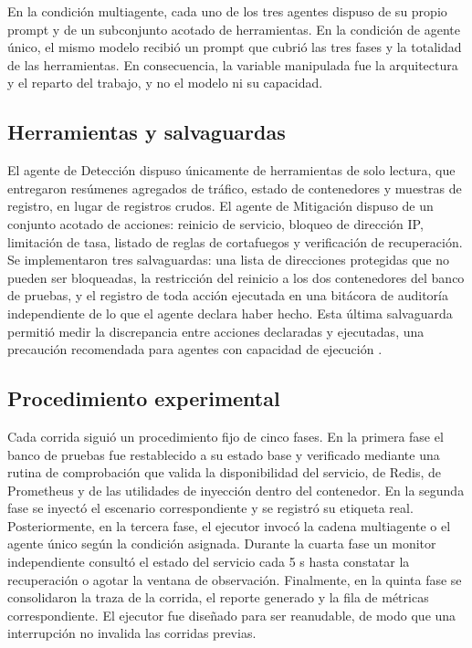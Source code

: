 \documentclass[conference]{IEEEtran}
\begin{document}
En la condición multiagente, cada uno de los tres agentes dispuso de su propio prompt
y de un subconjunto acotado de herramientas. En la condición de agente único, el mismo
modelo recibió un prompt que cubrió las tres fases y la totalidad de las herramientas.
En consecuencia, la variable manipulada fue la arquitectura y el reparto del trabajo,
y no el modelo ni su capacidad.

\subsection{Herramientas y salvaguardas}
El agente de Detección dispuso únicamente de herramientas de solo lectura, que
entregaron resúmenes agregados de tráfico, estado de contenedores y muestras de
registro, en lugar de registros crudos. El agente de Mitigación dispuso de un
conjunto acotado de acciones: reinicio de servicio, bloqueo de dirección IP,
limitación de tasa, listado de reglas de cortafuegos y verificación de recuperación.
Se implementaron tres salvaguardas: una lista de direcciones protegidas que no
pueden ser bloqueadas, la restricción del reinicio a los dos contenedores del banco
de pruebas, y el registro de toda acción ejecutada en una bitácora de auditoría
independiente de lo que el agente declara haber hecho. Esta última salvaguarda
permitió medir la discrepancia entre acciones declaradas y ejecutadas, una
precaución recomendada para agentes con capacidad de ejecución \cite{hu2026,
debenedetti2026}.

\subsection{Procedimiento experimental}
Cada corrida siguió un procedimiento fijo de cinco fases. En la primera fase el
banco de pruebas fue restablecido a su estado base y verificado mediante una rutina
de comprobación que valida la disponibilidad del servicio, de Redis, de Prometheus y
de las utilidades de inyección dentro del contenedor. En la segunda fase se inyectó
el escenario correspondiente y se registró su etiqueta real. Posteriormente, en la
tercera fase, el ejecutor invocó la cadena multiagente o el agente único según la
condición asignada. Durante la cuarta fase un monitor independiente consultó el
estado del servicio cada 5 s hasta constatar la recuperación o agotar la ventana de
observación. Finalmente, en la quinta fase se consolidaron la traza de la corrida,
el reporte generado y la fila de métricas correspondiente. El ejecutor fue diseñado
para ser reanudable, de modo que una interrupción no invalida las corridas previas.
\end{document}
